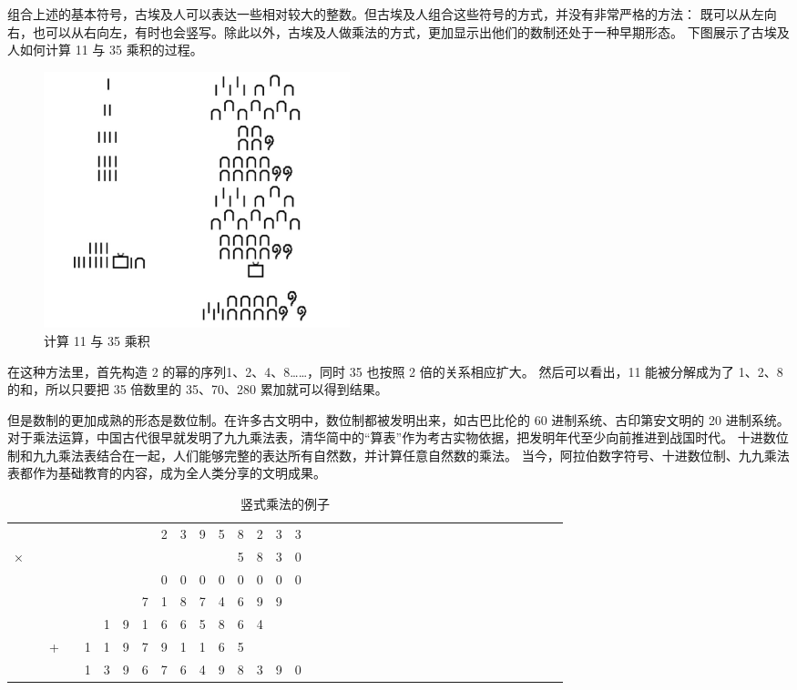 \documentclass[a4paper,10.5pt]{book}
\begin{document}
组合上述的基本符号，古埃及人可以表达一些相对较大的整数。但古埃及人组合这些符号的方式，并没有非常严格的方法：
既可以从左向右，也可以从右向左，有时也会竖写。除此以外，古埃及人做乘法的方式，更加显示出他们的数制还处于一种早期形态。
下图展示了古埃及人如何计算 11 与 35 乘积的过程。

\begin{figure}[ht]
\centering
\includegraphics[width=3.5in]{images/ancient_egypt_multiplication.jpg}
\caption{计算 11 与 35 乘积}
\end{figure}

在这种方法里，首先构造 2 的幂的序列1、2、4、8……，同时 35 也按照 2 倍的关系相应扩大。
然后可以看出，11 能被分解成为了 1、2、8 的和，所以只要把 35 倍数里的 35、70、280 累加就可以得到结果。

但是数制的更加成熟的形态是数位制。在许多古文明中，数位制都被发明出来，如古巴比伦的 60 进制系统、古印第安文明的 20 进制系统。
对于乘法运算，中国古代很早就发明了九九乘法表，清华简中的“算表”作为考古实物依据，把发明年代至少向前推进到战国时代。
十进数位制和九九乘法表结合在一起，人们能够完整的表达所有自然数，并计算任意自然数的乘法。
当今，阿拉伯数字符号、十进数位制、九九乘法表都作为基础教育的内容，成为全人类分享的文明成果。

\begin{table}[tbhp]
\centering
\begin{tabular}{cccccccccccccccccccccccccccccccccccc}
  &   &   &   &   &   &   &   & 2 & 3 & 9 & 5 & 8 & 2 & 3 & 3\\
× &   &   &   &   &   &   &   &   &   &   &   & 5 & 8 & 3 & 0\\
\hline
  &   &   &   &   &   &   &   & 0 & 0 & 0 & 0 & 0 & 0 & 0 & 0\\
  &   &   &   &   &   &   & 7 & 1 & 8 & 7 & 4 & 6 & 9 & 9 &  \\
  &   &   &   &   & 1 & 9 & 1 & 6 & 6 & 5 & 8 & 6 & 4 &   &  \\
  &   & + &   & 1 & 1 & 9 & 7 & 9 & 1 & 1 & 6 & 5 &   &   &  \\
\hline
  &   &   &   & 1 & 3 & 9 & 6 & 7 & 6 & 4 & 9 & 8 & 3 & 9 & 0\\
\end{tabular}
\caption{竖式乘法的例子}
\end{table}
\end{document}
